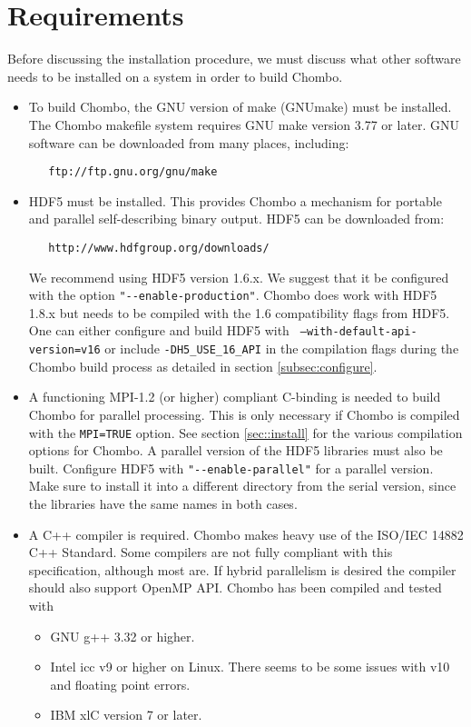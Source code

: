 
\section{Requirements}

Before discussing the installation procedure, we must discuss what
other software needs to be installed on a system in order to build Chombo.
\begin{itemize}
\item To build Chombo, the GNU version of make (GNUmake) must be installed.
The Chombo makefile system requires GNU make version 3.77 or later.  GNU
software can be downloaded from many places, including:
\begin{verbatim}
   ftp://ftp.gnu.org/gnu/make
\end{verbatim}

\item HDF5 must be installed.  This provides Chombo a mechanism for
  portable and parallel self-describing binary output.  HDF5 can be
  downloaded from:
\begin{verbatim}
   http://www.hdfgroup.org/downloads/
\end{verbatim}
We recommend using HDF5 version 1.6.x.  We suggest that it be configured
with the option \verb/"--enable-production"/.  Chombo does work with HDF5 1.8.x
but needs to be compiled with the 1.6 compatibility flags from HDF5. 
One can either configure and build HDF5 with {\tt
  --with-default-api-version=v16} or include {\tt -DH5\_USE\_16\_API} 
in the compilation flags during the Chombo build process as detailed
in section \ref{subsec:configure}. 



\item A functioning MPI-1.2 (or higher) compliant C-binding 
is needed to build Chombo for
  parallel processing.  This is only necessary if Chombo is compiled with
  the \verb/MPI=TRUE/ option.  See section \ref{sec::install} for the
  various compilation options for Chombo.  A parallel version of the HDF5
  libraries must also be built.  Configure HDF5 with
  \verb/"--enable-parallel"/ for a parallel version.  Make sure to install
  it into a different directory from the serial version, since the libraries
  have the same names in both cases.

  
\item A C++ compiler is required.  Chombo makes heavy use of
  the ISO/IEC 14882 C++ Standard.  Some compilers are not fully compliant
  with this specification, although most are.  If hybrid
  parallelism is desired the compiler should also support OpenMP API.
 Chombo has been compiled and
  tested with
  \begin{itemize}
  \item GNU g++ 3.32 or higher.
  \item Intel icc v9 or higher on Linux.  There seems to be some issues with v10 and
floating point errors. 
  \item IBM xlC version 7 or later. 
  \end{itemize}
  

\end{itemize}
